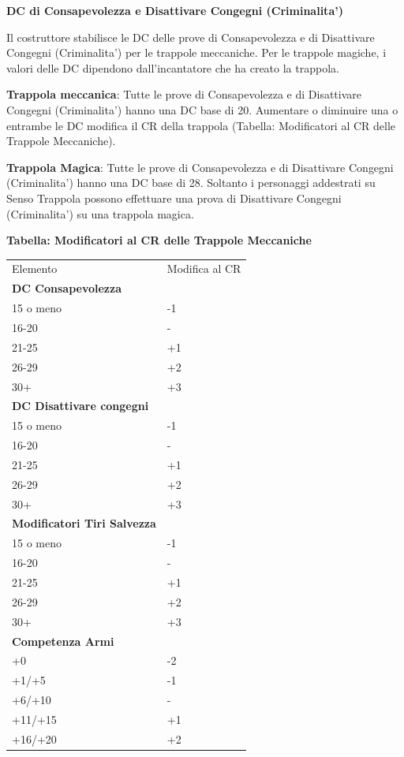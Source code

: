\documentclass[a4paper,11pt,twoside,openany]{book}
\begin{document}
{		\textbf{DC di Consapevolezza e Disattivare Congegni (Criminalita')}
		
		Il costruttore stabilisce le DC delle prove di Consapevolezza e di Disattivare Congegni (Criminalita') per le trappole meccaniche. Per le trappole magiche, i valori delle DC dipendono dall'incantatore che ha creato la trappola.
		
		\textbf{Trappola meccanica}: Tutte le prove di Consapevolezza e di Disattivare Congegni (Criminalita') hanno una DC base di 20. Aumentare o diminuire una o entrambe le DC modifica il CR della trappola (Tabella: Modificatori al CR delle Trappole Meccaniche). 
		
		\textbf{Trappola Magica}: Tutte le prove di Consapevolezza e di Disattivare Congegni (Criminalita') hanno una DC base di 28. Soltanto i personaggi addestrati su Senso Trappola possono effettuare una prova di Disattivare Congegni (Criminalita') su una trappola magica.
		
		\pagebreak
		
		\textbf{Tabella: Modificatori al CR delle Trappole Meccaniche}
		
		
		\begin{tabular}{ll}
			\toprule
			Elemento & Modifica al CR\tabularnewline
			\textbf{DC Consapevolezza}& \\
			15 o meno & -1\\
			16-20 &-\\
			21-25 &+1\\
			26-29 &+2\\
			30+ &+3\\
			\textbf{DC Disattivare congegni}
			&\\
			15 o meno &-1\\
			16-20 &-\\
			21-25 &+1\\
			26-29 &+2\\
			30+ &+3\\
			\textbf{Modificatori Tiri Salvezza}&\\
			15 o meno &-1\\
			16-20 &-\\
			21-25 &+1\\
			26-29 &+2\\
			30+ &+3\\
			\textbf{Competenza Armi}&\\
			+0 &-2\\
			+1/+5 &-1\\
			+6/+10 &-\\
			+11/+15 &+1\\
			+16/+20 &+2\\
			

\end{tabular}}
\end{document}
